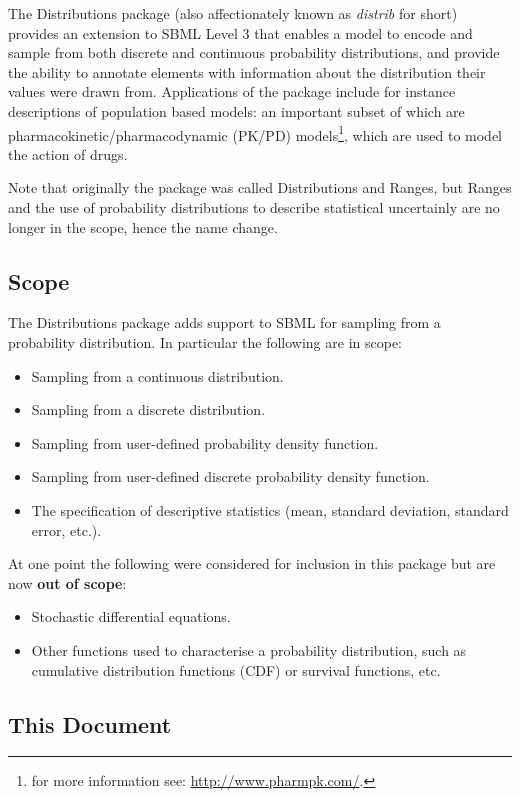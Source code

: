 \documentclass[draftspec]{sbmlpkgspec}
\newcommand{\distribshort}{\emph{distrib}\xspace}
\newcommand{\distrib}{Distributions\xspace}
\begin{document}
The \distrib package (also affectionately known as \distribshort for
short) provides an extension to SBML Level 3 that enables a model to encode and sample from
both discrete and continuous probability distributions, and provide
the ability to annotate elements with information about the distribution their
values were drawn from. 
Applications of the package include for instance descriptions of
population based models: an important subset of which are
pharmacokinetic/pharmacodynamic (PK/PD) models\footnote{for more
  information see: \url{http://www.pharmpk.com/}.}, which are used to
model the action of drugs.

Note that originally the package was called Distributions and Ranges,
but Ranges and the use of probability distributions to describe
statistical uncertainly are no longer in the scope, hence the name change.

\subsection{Scope}

The \distrib package adds support to SBML for sampling from a
probability distribution. In particular the following are in scope:

\begin{itemize}
\item Sampling from a continuous distribution.
\item Sampling from a discrete distribution.
\item Sampling from user-defined probability density function.
\item Sampling from user-defined discrete probability density function.
\item The specification of descriptive statistics (mean, standard
  deviation, standard error, etc.).
\end{itemize}

At one point the following were considered for inclusion in this
package but are now \textbf{out of scope}:

\begin{itemize}
\item Stochastic differential equations.
\item Other functions used to characterise a probability distribution,
  such as cumulative distribution functions (CDF) or survival functions, etc.
\end{itemize}

\subsection{This Document}
\end{document}
